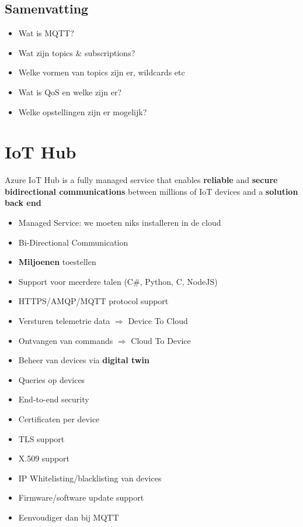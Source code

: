 \documentclass{article}
\newcommand{\bold}[1]{\textbf{#1}}
\begin{document}
\subsection{Samenvatting}

\begin{itemize}
    \item Wat is MQTT?
    \item Wat zijn topics \& subscriptions?
    \item Welke vormen van topics zijn er, wildcards etc
    \item Wat is QoS en welke zijn er?
    \item Welke opstellingen zijn er mogelijk?
\end{itemize}

\section{IoT Hub}

Azure IoT Hub is a fully managed service that enables \bold{reliable} and \bold{secure}
\bold{bidirectional communications} between millions of IoT devices and a
\bold{solution back end}

\begin{itemize}
    \item Managed Service: we moeten niks installeren in de cloud
    \item Bi-Directional Communication
    \item \bold{Miljoenen} toestellen
    \item Support voor meerdere talen (C\#, Python, C, NodeJS)
    \item HTTPS/AMQP/MQTT protocol support
    \item Versturen telemetrie data $\Rightarrow$ Device To Cloud
    \item Ontvangen van commands $\Rightarrow$ Cloud To Device
    \item Beheer van devices via \bold{digital twin}
    \item Queries op devices
    \item End-to-end security
    \item Certificaten per device
    \item TLS support
    \item X.509 support
    \item IP Whitelisting/blacklisting van devices
    \item Firmware/software update support
    \item Eenvoudiger dan bij MQTT
\end{itemize}
\end{document}
